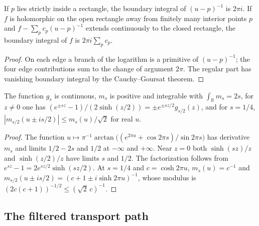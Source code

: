 \begin{lemma}\label{lem:rectangle_simple_poles}
    \leanok
    If $p$ lies strictly inside a rectangle, the boundary integral of $(u-p)^{-1}$
    is $2\pi i$. If $f$ is holomorphic on the open rectangle away from finitely many
    interior points $p$ and $f-\sum_pc_p(u-p)^{-1}$ extends continuously to the
    closed rectangle, the boundary integral of $f$ is $2\pi i\sum_pc_p$.
\end{lemma}

\begin{proof}\leanok
    On each edge a branch of the logarithm is a primitive of $(u-p)^{-1}$; the
    four edge contributions sum to the change of argument $2\pi$. The regular
    part has vanishing boundary integral by the Cauchy--Goursat theorem.
\end{proof}

\begin{lemma}\label{lem:sinh_ratio_density_elementary}
    \leanok
    The function $g_s$ is continuous, $m_s$ is positive and integrable with
    $\int_{\mathbb R}m_s=2s$, for $z\ne0$ one has
    $(e^{\pm sz}-1)/(2\sinh(z/2))=\pm e^{\pm sz/2}g_{s/2}(z)$, and for $s=1/4$,
    $|m_{s/2}(u\pm is/2)|\le m_s(u)/\sqrt2$ for real $u$.
\end{lemma}

\begin{proof}\leanok
    The function $u\mapsto\pi^{-1}\arctan\bigl((e^{2\pi u}+\cos2\pi s)/\sin2\pi s\bigr)$
    has derivative $m_s$ and limits $1/2-2s$ and $1/2$ at $-\infty$ and
    $+\infty$. Near $z=0$ both $\sinh(sz)/z$ and $\sinh(z/2)/z$ have limits
    $s$ and $1/2$. The factorization follows from
    $e^{sz}-1=2e^{sz/2}\sinh(sz/2)$. At $s=1/4$ and $c=\cosh2\pi u$,
    $m_s(u)=c^{-1}$ and $m_{s/2}(u\pm is/2)=(c+1\pm i\sinh2\pi u)^{-1}$, whose
    modulus is $(2c(c+1))^{-1/2}\le(\sqrt2\,c)^{-1}$.
\end{proof}


\subsection{The filtered transport path}


